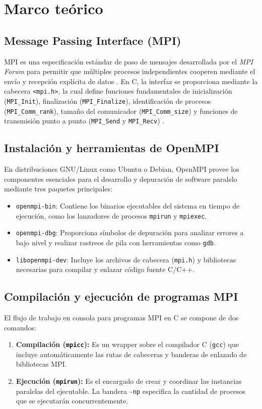 \section{Marco teórico}

\subsection{Message Passing Interface (MPI)}
MPI es una especificación estándar de paso de mensajes desarrollada por el \textit{MPI Forum} para permitir que múltiples procesos independientes cooperen mediante el envío y recepción explícita de datos \cite{mpiforum2021}. En C, la interfaz se proporciona mediante la cabecera \texttt{<mpi.h>}, la cual define funciones fundamentales de inicialización (\texttt{MPI\_Init}), finalización (\texttt{MPI\_Finalize}), identificación de procesos (\texttt{MPI\_Comm\_rank}), tamaño del comunicador (\texttt{MPI\_Comm\_size}) y funciones de transmisión punto a punto (\texttt{MPI\_Send} y \texttt{MPI\_Recv}) \cite{pacheco2011}.

\subsection{Instalación y herramientas de OpenMPI}
En distribuciones GNU/Linux como Ubuntu o Debian, OpenMPI provee los componentes esenciales para el desarrollo y depuración de software paralelo \cite{openmpi2024} mediante tres paquetes principales:
\begin{itemize}
    \item \texttt{openmpi-bin}: Contiene los binarios ejecutables del sistema en tiempo de ejecución, como los lanzadores de procesos \texttt{mpirun} y \texttt{mpiexec}.
    \item \texttt{openmpi-dbg}: Proporciona símbolos de depuración para analizar errores a bajo nivel y realizar rastreos de pila con herramientas como \texttt{gdb}.
    \item \texttt{libopenmpi-dev}: Incluye los archivos de cabecera (\texttt{mpi.h}) y bibliotecas necesarias para compilar y enlazar código fuente C/C++.
\end{itemize}

\subsection{Compilación y ejecución de programas MPI}
El flujo de trabajo en consola para programas MPI en C se compone de dos comandos:
\begin{enumerate}
    \item \textbf{Compilación (\texttt{mpicc}):} Es un wrapper sobre el compilador C (\texttt{gcc}) que incluye automáticamente las rutas de cabeceras y banderas de enlazado de bibliotecas MPI.
    \item \textbf{Ejecución (\texttt{mpirun}):} Es el encargado de crear y coordinar las instancias paralelas del ejecutable. La bandera \texttt{-np} especifica la cantidad de procesos que se ejecutarán concurrentemente.
\end{enumerate}

